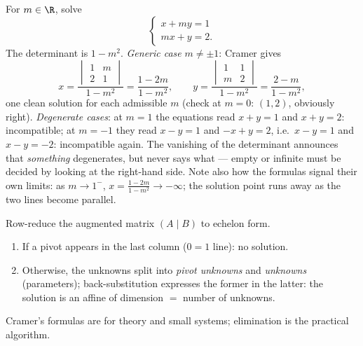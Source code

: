 \begin{example}
\label{ex:b1:det:cramerparameter}
For $m \in \R$, solve
\[
\begin{cases}
x + m y = 1\\
m x + y = 2 .
\end{cases}
\]
The determinant is $1 - m^2$. \emph{Generic case} $m \neq \pm1$:
Cramer gives
\[
x = \frac{\begin{vmatrix} 1 & m\\ 2 & 1\end{vmatrix}}{1 - m^2}
= \frac{1 - 2m}{1 - m^2},
\qquad
y = \frac{\begin{vmatrix} 1 & 1\\ m & 2\end{vmatrix}}{1 - m^2}
= \frac{2 - m}{1 - m^2},
\]
one clean solution for each admissible $m$ (check at $m = 0$:
$(1, 2)$, obviously right). \emph{Degenerate cases}: at $m = 1$
the equations read $x + y = 1$ and $x + y = 2$: incompatible; at
$m = -1$ they read $x - y = 1$ and $-x + y = 2$, i.e.\ $x - y =
1$ and $x - y = -2$: incompatible again. The vanishing of the
determinant announces that \emph{something} degenerates, but
never says what --- empty or infinite must be decided by looking
at the right-hand side. Note also how the formulas signal their
own limits: as $m \to 1^{-}$, $x = \frac{1 - 2m}{1 - m^2} \to
-\infty$; the solution point runs away as the two lines become
parallel.
\end{example}

\begin{method}\label{met:b1:det:gauss}
Row-reduce the augmented matrix $(A \mid B)$ to echelon
form.
\begin{enumerate}
  \item If a pivot appears in the last column ($0 = 1$ line): no
        solution.
  \item Otherwise, the unknowns split into \emph{pivot unknowns} and
        \emph{ unknowns} (parameters); back-substitution
        expresses the former in the latter: the solution  is an
        affine  of dimension $=$ number of  unknowns.
\end{enumerate}
Cramer's formulas are for theory and small systems; elimination is
the practical algorithm.
\end{method}

